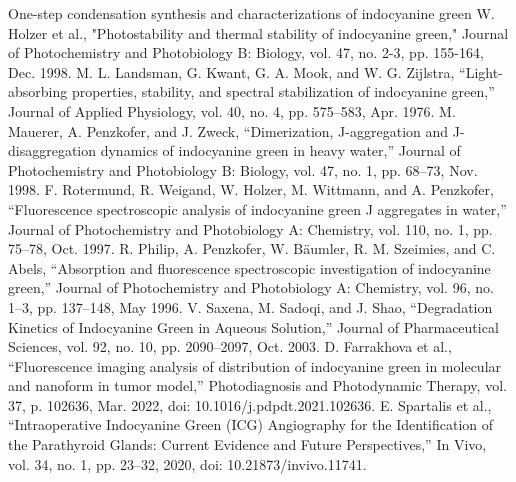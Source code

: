 \begin{thebibliography}{icg}
	 One-step condensation synthesis and characterizations of indocyanine green
	W. Holzer et al., "Photostability and thermal stability of indocyanine green," Journal of Photochemistry and Photobiology B: Biology,  vol. 47, no. 2-3, pp. 155-164, Dec. 1998.
	M. L. Landsman, G. Kwant, G. A. Mook, and W. G. Zijlstra, “Light-absorbing properties, stability, and spectral stabilization of indocyanine green,” Journal of Applied Physiology, vol. 40, no. 4, pp. 575–583, Apr. 1976.
	M. Mauerer, A. Penzkofer, and J. Zweck, “Dimerization, J-aggregation and J-disaggregation dynamics of indocyanine green in heavy water,” Journal of Photochemistry and Photobiology B: Biology, vol. 47, no. 1, pp. 68–73, Nov. 1998.
	F. Rotermund, R. Weigand, W. Holzer, M. Wittmann, and A. Penzkofer, “Fluorescence spectroscopic analysis of indocyanine green J aggregates in water,” Journal of Photochemistry and Photobiology A: Chemistry, vol. 110, no. 1, pp. 75–78, Oct. 1997.
	R. Philip, A. Penzkofer, W. Bäumler, R. M. Szeimies, and C. Abels, “Absorption and fluorescence spectroscopic investigation of indocyanine green,” Journal of Photochemistry and Photobiology A: Chemistry, vol. 96, no. 1–3, pp. 137–148, May 1996.
	V. Saxena, M. Sadoqi, and J. Shao, “Degradation Kinetics of Indocyanine Green in Aqueous Solution,” Journal of Pharmaceutical Sciences, vol. 92, no. 10, pp. 2090–2097, Oct. 2003. 
	D. Farrakhova et al., “Fluorescence imaging analysis of distribution of indocyanine green in molecular and nanoform in tumor model,” Photodiagnosis and Photodynamic Therapy, vol. 37, p. 102636, Mar. 2022, doi: 10.1016/j.pdpdt.2021.102636.
	 E. Spartalis et al., “Intraoperative Indocyanine Green (ICG) Angiography for the Identification of the Parathyroid Glands: Current Evidence and Future Perspectives,” In Vivo, vol. 34, no. 1, pp. 23–32, 2020, doi: 10.21873/invivo.11741.
\end{thebibliography}